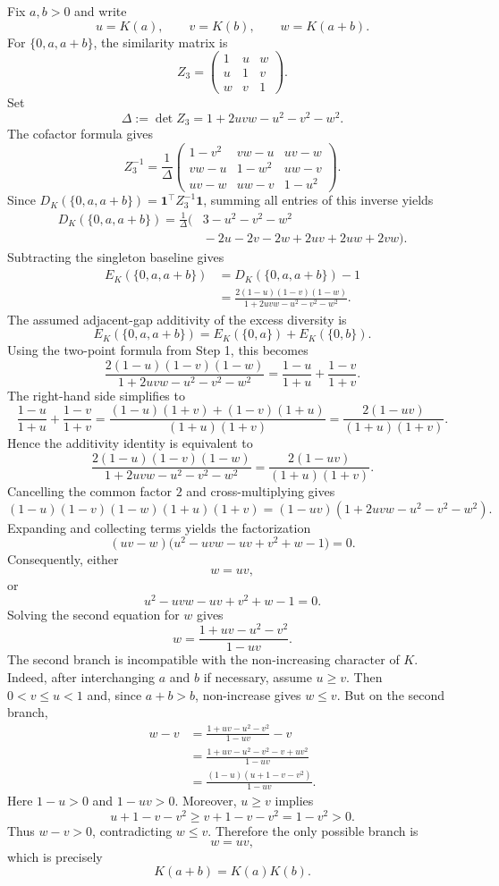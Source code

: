\documentclass[12pt,a4paper]{article}
\begin{document}
Fix $a,b>0$ and write
\[
  u=K(a),\qquad v=K(b),\qquad w=K(a+b).
\]
For $\{0,a,a+b\}$, the similarity matrix is
\[
  Z_3=
  \begin{pmatrix}
  1&u&w\\
  u&1&v\\
  w&v&1
  \end{pmatrix}.
\]
Set
\[
  \Delta:=\det Z_3=1+2uvw-u^2-v^2-w^2.
\]
The cofactor formula gives
\[
  Z_3^{-1}=\frac{1}{\Delta}
  \begin{pmatrix}
  1-v^2 & vw-u & uv-w\\
  vw-u & 1-w^2 & uw-v\\
  uv-w & uw-v & 1-u^2
  \end{pmatrix}.
\]
Since $D_K(\{0,a,a+b\})=\mathbf{1}^\top Z_3^{-1}\mathbf{1}$, summing all entries of this inverse yields
\[
\begin{aligned}
  D_K(\{0,a,a+b\})
  =\frac{1}{\Delta}\bigl(&3-u^2-v^2-w^2 \\
  &{}-2u-2v-2w+2uv+2uw+2vw\bigr).
\end{aligned}
\]
Subtracting the singleton baseline gives
\[
\begin{aligned}
  E_K(\{0,a,a+b\})
  &=D_K(\{0,a,a+b\})-1 \\
  &=\frac{2(1-u)(1-v)(1-w)}{1+2uvw-u^2-v^2-w^2}.
\end{aligned}
\]
The assumed adjacent-gap additivity of the excess diversity is
\[
  E_K(\{0,a,a+b\})
  =E_K(\{0,a\})+E_K(\{0,b\}).
\]
Using the two-point formula from Step 1, this becomes
\[
  \frac{2(1-u)(1-v)(1-w)}{1+2uvw-u^2-v^2-w^2}
  =\frac{1-u}{1+u}+\frac{1-v}{1+v}.
\]
The right-hand side simplifies to
\[
  \frac{1-u}{1+u}+\frac{1-v}{1+v}
  =\frac{(1-u)(1+v)+(1-v)(1+u)}{(1+u)(1+v)}
  =\frac{2(1-uv)}{(1+u)(1+v)}.
\]
Hence the additivity identity is equivalent to
\[
  \frac{2(1-u)(1-v)(1-w)}{1+2uvw-u^2-v^2-w^2}
  =\frac{2(1-uv)}{(1+u)(1+v)}.
\]
Cancelling the common factor $2$ and cross-multiplying gives
\[
  (1-u)(1-v)(1-w)(1+u)(1+v)
  =(1-uv)(1+2uvw-u^2-v^2-w^2).
\]
Expanding and collecting terms yields the factorization
\[
  (uv-w)\bigl(u^2-uvw-uv+v^2+w-1\bigr)=0.
\]
Consequently, either
\[
  w=uv,
\]
or
\[
  u^2-uvw-uv+v^2+w-1=0.
\]
Solving the second equation for $w$ gives
\[
  w=\frac{1+uv-u^2-v^2}{1-uv}.
\]
The second branch is incompatible with the non-increasing character of $K$.  Indeed, after interchanging $a$ and $b$ if necessary, assume $u\geq v$.  Then $0<v\leq u<1$ and, since $a+b>b$, non-increase gives $w\leq v$.  But on the second branch,
\[
\begin{aligned}
  w-v
  &=\frac{1+uv-u^2-v^2}{1-uv}-v \\
  &=\frac{1+uv-u^2-v^2-v+uv^2}{1-uv} \\
  &=\frac{(1-u)(u+1-v-v^2)}{1-uv}.
\end{aligned}
\]
Here $1-u>0$ and $1-uv>0$.  Moreover, $u\geq v$ implies
\[
  u+1-v-v^2\geq v+1-v-v^2=1-v^2>0.
\]
Thus $w-v>0$, contradicting $w\leq v$.  Therefore the only possible branch is
\[
  w=uv,
\]
which is precisely
\[
  K(a+b)=K(a)K(b).
\]
\end{document}
